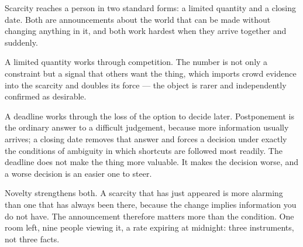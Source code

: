 


\begin{core}
Scarcity reaches a person in two standard forms: a limited quantity and a closing date. Both are announcements about the world that can be made without changing anything in it, and both work hardest when they arrive together and suddenly.
\end{core}

\begin{mechanism}
A limited quantity works through competition. The number is not only a constraint but a signal that others want the thing, which imports crowd evidence into the scarcity and doubles its force --- the object is rarer and independently confirmed as desirable.

A deadline works through the loss of the option to decide later. Postponement is the ordinary answer to a difficult judgement, because more information usually arrives; a closing date removes that answer and forces a decision under exactly the conditions of ambiguity in which shortcuts are followed most readily. The deadline does not make the thing more valuable. It makes the decision worse, and a worse decision is an easier one to steer.

Novelty strengthens both. A scarcity that has just appeared is more alarming than one that has always been there, because the change implies information you do not have. The announcement therefore matters more than the condition.
One room left, nine people viewing it, a rate expiring at midnight: three instruments, not three facts.
\end{mechanism}



